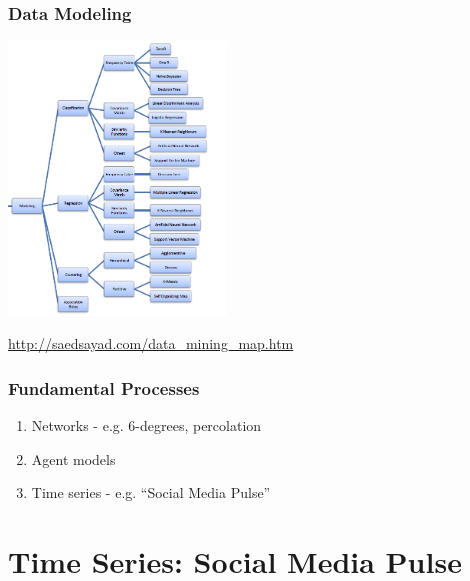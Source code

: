 \documentclass{beamer}
\begin{document}
\begin{frame}\frametitle{Data Modeling}
  \begin{center}
    \includegraphics[width=5.8cm]{./imgs/modeling.png} \\
  \end{center}
      \textcolor{white}{\tiny \url{http://saedsayad.com/data_mining_map.htm}}
\end{frame}

\begin{frame}\frametitle{Fundamental Processes}
	\begin{enumerate}
	\item Networks - e.g. 6-degrees, percolation
	\item Agent models
	\item Time series - e.g. ``Social Media Pulse''
	\end{enumerate}
\end{frame}

\section{Time Series: Social Media Pulse}
{
\begin{frame}
\textcolor{black} {
\hfill \Huge \insertsection}
\end{frame}
}
\end{document}
